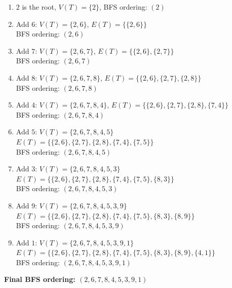 \documentclass{article}
\theoremstyle{definition}
\begin{document}
\begin{enumerate}
\item $2$ is the root, $V(T) = \{2\}$, BFS ordering: $(2)$

\item Add $6$: $V(T) = \{2, 6\}$, $E(T) = \{\{2, 6\}\}$\\
   BFS ordering: $(2, 6)$
   
\item Add $7$: $V(T) = \{2, 6, 7\}$, $E(T) = \{\{2, 6\}, \{2, 7\}\}$\\
   BFS ordering: $(2, 6, 7)$
   
\item Add $8$: $V(T) = \{2, 6, 7, 8\}$, $E(T) = \{\{2, 6\}, \{2, 7\}, \{2, 8\}\}$\\
   BFS ordering: $(2, 6, 7, 8)$
   
\item Add $4$: $V(T) = \{2, 6, 7, 8, 4\}$, $E(T) = \{\{2, 6\}, \{2, 7\}, \{2, 8\}, \{7, 4\}\}$\\
   BFS ordering: $(2, 6, 7, 8, 4)$
   
\item Add $5$: $V(T) = \{2, 6, 7, 8, 4, 5\}$\\
   $E(T) = \{\{2, 6\}, \{2, 7\}, \{2, 8\}, \{7, 4\}, \{7, 5\}\}$\\
   BFS ordering: $(2, 6, 7, 8, 4, 5)$
   
\item Add $3$: $V(T) = \{2, 6, 7, 8, 4, 5, 3\}$\\
   $E(T) = \{\{2, 6\}, \{2, 7\}, \{2, 8\}, \{7, 4\}, \{7, 5\}, \{8, 3\}\}$\\
   BFS ordering: $(2, 6, 7, 8, 4, 5, 3)$
   
\item Add $9$: $V(T) = \{2, 6, 7, 8, 4, 5, 3, 9\}$\\
   $E(T) = \{\{2, 6\}, \{2, 7\}, \{2, 8\}, \{7, 4\}, \{7, 5\}, \{8, 3\}, \{8, 9\}\}$\\
   BFS ordering: $(2, 6, 7, 8, 4, 5, 3, 9)$
   
\item Add $1$: $V(T) = \{2, 6, 7, 8, 4, 5, 3, 9, 1\}$\\
   $E(T) = \{\{2, 6\}, \{2, 7\}, \{2, 8\}, \{7, 4\}, \{7, 5\}, \{8, 3\}, \{8, 9\}, \{4, 1\}\}$\\
   BFS ordering: $(2, 6, 7, 8, 4, 5, 3, 9, 1)$
\end{enumerate}

\textbf {Final BFS ordering: $(2, 6, 7, 8, 4, 5, 3, 9, 1)$}
\end{document}
